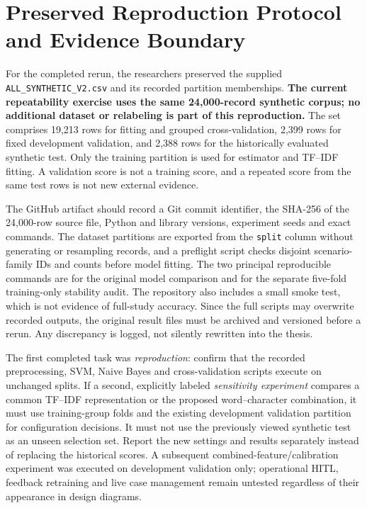 \section{Preserved Reproduction Protocol and Evidence Boundary}
\label{sec:prerun}
For the completed rerun, the researchers preserved the supplied \texttt{ALL\_SYNTHETIC\_V2.csv} and its recorded partition memberships. \textbf{The current repeatability exercise uses the same 24,000-record synthetic corpus; no additional dataset or relabeling is part of this reproduction.} The set comprises 19,213 rows for fitting and grouped cross-validation, 2,399 rows for fixed development validation, and 2,388 rows for the historically evaluated synthetic test. Only the training partition is used for estimator and TF--IDF fitting. A validation score is not a training score, and a repeated score from the same test rows is not new external evidence.

The GitHub artifact should record a Git commit identifier, the SHA-256 of the 24,000-row source file, Python and library versions, experiment seeds and exact commands. The dataset partitions are exported from the \texttt{split} column without generating or resampling records, and a preflight script checks disjoint scenario-family IDs and counts before model fitting. The two principal reproducible commands are  for the original model comparison and  for the separate five-fold training-only stability audit. The repository also includes a small smoke test, which is not evidence of full-study accuracy. Since the full scripts may overwrite recorded outputs, the original result files must be archived and versioned before a rerun. Any discrepancy is logged, not silently rewritten into the thesis.

The first completed task was \emph{reproduction}: confirm that the recorded preprocessing, SVM, Naive Bayes and cross-validation scripts execute on unchanged splits. If a second, explicitly labeled \emph{sensitivity experiment} compares a common TF--IDF representation or the proposed word--character combination, it must use training-group folds and the existing development validation partition for configuration decisions. It must not use the previously viewed synthetic test as an unseen selection set. Report the new settings and results separately instead of replacing the historical scores. A subsequent combined-feature/calibration experiment was executed on development validation only; operational HITL, feedback retraining and live case management remain untested regardless of their appearance in design diagrams.

